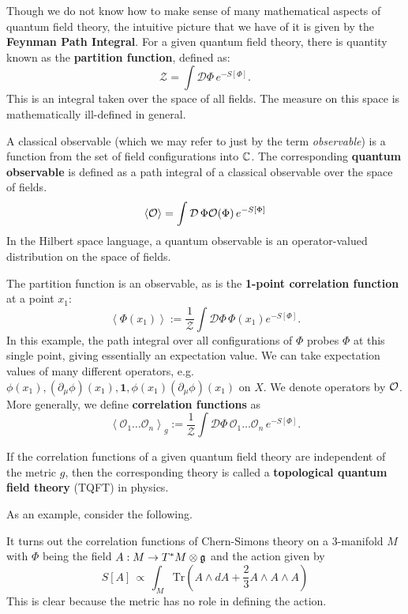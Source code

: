 		Though we do not know how to make sense of many mathematical aspects of quantum field theory, the intuitive picture that we have of it is given by the \textbf{Feynman Path Integral}. For a given quantum field theory, there is quantity known as the \textbf{partition function}, defined as:
		\begin{equation}\label{eq:Z}
			\mathcal Z = \int \mathcal D\Phi\, e^{- S[\Phi]}.
		\end{equation}
		This is an integral taken over the space of all fields. The measure on this space is mathematically ill-defined in general. 
		\begin{phys}
			A classical observable (which we may refer to just by the term \emph{observable}) is a function from the set of field configurations into $\mathbb{C}$. The corresponding \textbf{quantum observable} is defined as a path integral of a classical observable over the space of fields. 
			\[
				\left< \mathcal{O} \right> = \int \mathcal D \, \Phi \mathcal{O}(\Phi) \, e^{-S[\Phi]}
			\]
			In the Hilbert space language, a quantum observable is an operator-valued distribution on the space of fields. 
		\end{phys}
		The partition function is an observable, as is the \textbf{1-point correlation function} at a point $x_1$:
		$$\left< \Phi(x_1) \right> := \frac{1}{\mathcal Z} \int \mathcal D\Phi \, \Phi(x_1) e^{-S[\Phi]}.$$
		In this example, the path integral over all configurations of $\Phi$ probes $\Phi$ at this single point, giving essentially an expectation value. We can take expectation values of many different operators, e.g. $\phi(x_1), (\partial_\mu \phi)(x_1), \mathbf{1}, \phi(x_1) (\partial_\mu \phi)(x_1)$ on $X$. We denote operators by $\mathcal{O}$. More generally, we define \textbf{correlation functions} as 
		$$\left< \mathcal O_1 \dots \mathcal O_n \right>_g := \frac{1}{\mathcal Z} \int \mathcal D\Phi \, \mathcal O_1 \dots \mathcal O_n \, e^{-S[\Phi]}.$$
		\begin{phys}[TQFT]
			If the correlation functions of a given quantum field theory are independent of the metric $g$, then the corresponding theory is called a \textbf{topological quantum field theory} (TQFT) in physics.
		\end{phys}
		As an example, consider the following.
		\begin{eg}
			It turns out the correlation functions of Chern-Simons theory on a 3-manifold $M$ with $\Phi$ being the field $A: M \to T^* M \otimes \frak g$ and the action given by
			$$S[A] \, \propto\,  \int_{M} \mathrm{Tr}\left(A \wedge dA + \frac23 A \wedge A \wedge A \right)$$
			This is clear because the metric has no role in defining the action.
		\end{eg}
		

